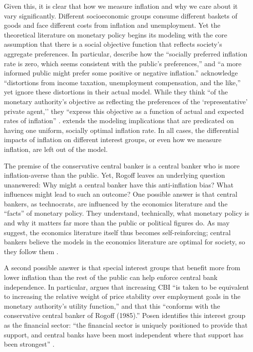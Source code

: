\documentclass[12pt,a4paper]{article}
\begin{document}
\begin{doublespace}
Given this, it is clear that how we measure inflation and why we care about it vary significantly. Different socioeconomic groups consume different baskets of goods and face different costs from inflation and unemployment. Yet the theoretical literature on monetary policy begins its modeling with the core assumption that there is a social objective function that reflects society's aggregate preferences. In particular, \textcite[480]{kydland_rules_1977} describe how the ``socially preferred inflation rate is zero, which seems consistent with the public's preferences,'' and ``a more informed public might prefer some  positive or negative inflation.'' \textcite[103]{barro_rules_1983} acknowledge ``distortions from income taxation, unemployment compensation, and the like,'' yet ignore these distortions in their actual model. While they think ``of the monetary authority’s objective as reflecting the preferences of the `representative’ private agent,'' they ``express this objective as a function of actual and expected rates of inflation'' \parencite[102]{barro_rules_1983}. \textcite{rogoff_optimal_1985} extends the modeling implications that are predicated on having one uniform, socially optimal inflation rate. In all cases, the differential impacts of inflation on different interest groups, or even how we measure inflation, are left out of the model. 

The premise of the conservative central banker is a central banker who is more inflation-averse than the public. Yet, Rogoff leaves an underlying question unanswered: Why might a central banker have this anti-inflation bias? What influences might lead to such an outcome? One possible answer is that central bankers, as technocrats, are influenced by the economics literature and the ``facts'' of monetary policy. They understand, technically, what monetary policy is and why it matters far more than the public or political figures do. As \textcite{weiss_many_1979} may suggest, the economics literature itself thus becomes self-reinforcing; central bankers believe the models in the economics literature are optimal for society, so they follow them \parencite{kwak_cultural_2013}. 

A second possible answer is that special interest groups that benefit more from lower inflation than the rest of the public can help enforce central bank independence. In particular, \textcite[p. 256 n. 6]{posen_declarations_1995} argues that increasing CBI ``is taken to be equivalent to increasing the relative weight of price stability over employment goals in the monetary authority's utility function,'' and that this ``conforms with the conservative central banker of Rogoff (1985).'' Posen identifies this interest group as the financial sector: ``the financial sector is uniquely positioned to provide that support, and central banks have been most independent where that support has been strongest'' \parencite[254]{posen_declarations_1995}. 


\end{doublespace}
\end{document}
